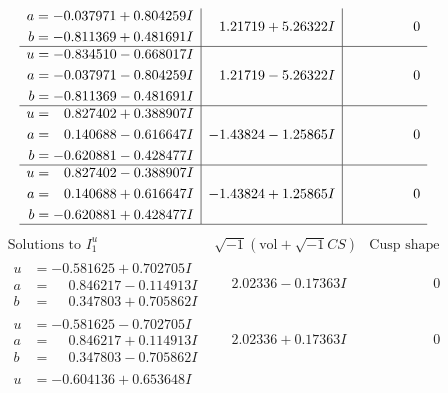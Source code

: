 \documentclass[1p]{elsarticle_modified}
\theoremstyle{definition}
\newcommand{\I}{\sqrt{-1}}
\begin{document}
$$\begin{array}{c|c|c}
\begin{aligned}
a &= -0.037971 + 0.804259 I \\
b &= -0.811369 + 0.481691 I\end{aligned}
 & \phantom{-}1.21719 + 5.26322 I & \phantom{-0.000000 } 0 \\ \hline\begin{aligned}
u &= -0.834510 - 0.668017 I \\
a &= -0.037971 - 0.804259 I \\
b &= -0.811369 - 0.481691 I\end{aligned}
 & \phantom{-}1.21719 - 5.26322 I & \phantom{-0.000000 } 0 \\ \hline\begin{aligned}
u &= \phantom{-}0.827402 + 0.388907 I \\
a &= \phantom{-}0.140688 - 0.616647 I \\
b &= -0.620881 - 0.428477 I\end{aligned}
 & -1.43824 - 1.25865 I & \phantom{-0.000000 } 0 \\ \hline\begin{aligned}
u &= \phantom{-}0.827402 - 0.388907 I \\
a &= \phantom{-}0.140688 + 0.616647 I \\
b &= -0.620881 + 0.428477 I\end{aligned}
 & -1.43824 + 1.25865 I & \phantom{-0.000000 } 0\\
 \hline 
 \end{array}$$\newpage$$\begin{array}{c|c|c}  
\text{Solutions to }I^u_{1}& \I (\text{vol} + \sqrt{-1}CS) & \text{Cusp shape}\\
 \hline 
\begin{aligned}
u &= -0.581625 + 0.702705 I \\
a &= \phantom{-}0.846217 - 0.114913 I \\
b &= \phantom{-}0.347803 + 0.705862 I\end{aligned}
 & \phantom{-}2.02336 - 0.17363 I & \phantom{-0.000000 } 0 \\ \hline\begin{aligned}
u &= -0.581625 - 0.702705 I \\
a &= \phantom{-}0.846217 + 0.114913 I \\
b &= \phantom{-}0.347803 - 0.705862 I\end{aligned}
 & \phantom{-}2.02336 + 0.17363 I & \phantom{-0.000000 } 0 \\ \hline\begin{aligned}
u &= -0.604136 + 0.653648 I \\

\end{aligned}
\end{array}$$
\end{document}
